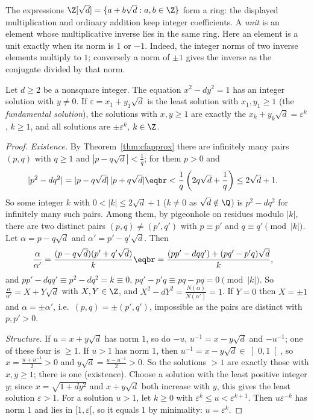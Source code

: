 The expressions $\Z[\sqrt d]=\{a+b\sqrt d:a,b\in\Z\}$ form a ring:
the displayed multiplication and ordinary addition keep integer coefficients.
A \emph{unit} is an element whose multiplicative inverse lies in the same ring.
Here an element is a unit exactly when its norm is $1$ or $-1$.
Indeed, the integer norms of two inverse elements multiply to $1$;
conversely a norm of $\pm1$ gives the inverse as the conjugate divided by that norm.


\begin{theorem}[Lagrange, 1768]\label{thm:pell}
Let $d\ge2$ be a nonsquare integer. The equation
$x^2-dy^2=1$ has an integer solution with $y\ne0$. If $\varepsilon=x_1+y_1\sqrt d$ is the least solution with $x_1,y_1\ge1$ (the \emph{fundamental solution}), the solutions with $x,y\ge1$ are exactly the $x_k+y_k\sqrt d=\varepsilon^k$, $k\ge1$, and all solutions are $\pm\varepsilon^k$, $k\in\Z$.
\end{theorem}
\begin{proof}
\emph{Existence.} By Theorem~\ref{thm:cfapprox} there are infinitely many pairs $(p,q)$ with $q\ge1$ and $|p-q\sqrt d|<\frac1q$; for them $p>0$ and
\[
\begin{aligned}|p^2-dq^2|&=|p-q\sqrt d|\,|p+q\sqrt d|\eqbr<\frac1q\left(2q\sqrt d+\frac1q\right)\le2\sqrt d+1.\end{aligned}
\]
So some integer $k$ with $0<|k|\le2\sqrt d+1$ ($k\ne0$ as $\sqrt d\notin\Q$) is $p^2-dq^2$ for infinitely many such pairs. Among them, by pigeonhole on residues modulo $|k|$, there are two distinct pairs $(p,q)\ne(p',q')$ with $p\equiv p'$ and $q\equiv q'\pmod{|k|}$. Let $\alpha=p-q\sqrt d$ and $\alpha'=p'-q'\sqrt d$. Then
\[
\begin{aligned}\frac\alpha{\alpha'}&=\frac{(p-q\sqrt d)(p'+q'\sqrt d)}{k}\eqbr=\frac{(pp'-dqq')+(pq'-p'q)\sqrt d}k,\end{aligned}
\]
and $pp'-dqq'\equiv p^2-dq^2=k\equiv0$, $pq'-p'q\equiv pq-pq=0\pmod{|k|}$. So $\frac\alpha{\alpha'}=X+Y\sqrt d$ with $X,Y\in\Z$, and $X^2-dY^2=\frac{N(\alpha)}{N(\alpha')}=1$. If $Y=0$ then $X=\pm1$ and $\alpha=\pm\alpha'$, i.e.\ $(p,q)=\pm(p',q')$, impossible as the pairs are distinct with $p,p'>0$.

\emph{Structure.} If $u=x+y\sqrt d$ has norm $1$, so do $-u$, $u^{-1}=x-y\sqrt d$ and $-u^{-1}$; one of these four is $\ge1$. If $u>1$ has norm $1$, then $u^{-1}=x-y\sqrt d\in\left]0,1\right[$, so $x=\frac{u+u^{-1}}2>0$ and $y\sqrt d=\frac{u-u^{-1}}2>0$. So the solutions $>1$ are exactly those with $x,y\ge1$; there is one (existence). Choose a solution with the least positive integer $y$; since $x=\sqrt{1+dy^2}$ and $x+y\sqrt d$ both increase with $y$, this gives the least solution $\varepsilon>1$. For a solution $u>1$, let $k\ge0$ with $\varepsilon^k\le u<\varepsilon^{k+1}$. Then $u\varepsilon^{-k}$ has norm $1$ and lies in $[1,\varepsilon[$, so it equals $1$ by minimality: $u=\varepsilon^k$.
\end{proof}

